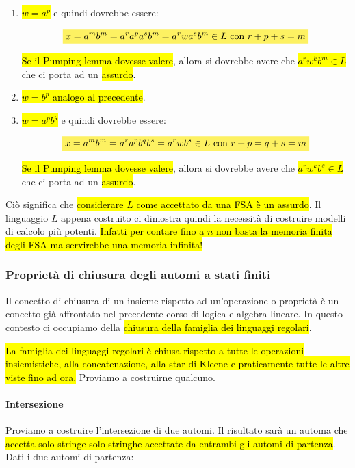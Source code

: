 \documentclass[a4paper,11pt,oneside]{article}
\theoremstyle{plain}
\theoremstyle{definition}
\theoremstyle{remark}
\newcommand{\mhl}[1]{\colorbox{hlcolor}{$\displaystyle #1$}}
\begin{document}
\begin{enumerate}
  \item \hl{$w = a^p$} e quindi dovrebbe essere:

    \begin{equation}
      \mhl{
      x = a^m b^m = a^r a^p a^s b^m = a^r w a^s b^m \in L \text{ con } r+p+s=m
      }
    \end{equation}

    \hl{Se il Pumping lemma dovesse valere}, allora si dovrebbe avere che
    \hl{$a^r w^k b^m \in L$} che ci porta ad un \hl{assurdo}.
  \item \hl{$w = b^p$ analogo al precedente}.
  \item \hl{$w = a^p b^q$} e quindi dovrebbe essere:

    \begin{equation}
      \mhl{
      x = a^m b^m = a^r a^p b^q b^s = a^r w b^s \in L \text{ con } r+p=q+s=m
      }
    \end{equation}

    \hl{Se il Pumping lemma dovesse valere}, allora si dovrebbe avere che
    \hl{$a^r w^k b^s \in L$} che ci porta ad un \hl{assurdo}.
\end{enumerate}

Ciò significa che \hl{considerare $L$ come accettato da una FSA è un assurdo}.
Il linguaggio $L$ appena costruito ci dimostra quindi la necessità di costruire
modelli di calcolo più potenti. \hl{Infatti per contare fino a $n$ non basta la
memoria finita degli FSA ma servirebbe una memoria infinita!}

\subsubsection{Proprietà di chiusura degli automi a stati finiti}\label{sec:chiusura-fsa}

Il concetto di chiusura di un insieme rispetto ad un'operazione o proprietà è
un concetto già affrontato nel precedente corso di logica e algebra lineare. In
questo contesto ci occupiamo della \hl{chiusura della famiglia dei linguaggi
regolari}.

\hl{La famiglia dei linguaggi regolari è chiusa rispetto a tutte le operazioni
insiemistiche, alla concatenazione, alla star di Kleene e praticamente tutte le
altre viste fino ad ora.} Proviamo a costruirne qualcuno.

\paragraph{Intersezione} Proviamo a costruire l'intersezione di due automi. Il
risultato sarà un automa che \hl{accetta solo stringe solo stringhe accettate da
entrambi gli automi di partenza}. Dati i due automi di partenza:
\end{document}
